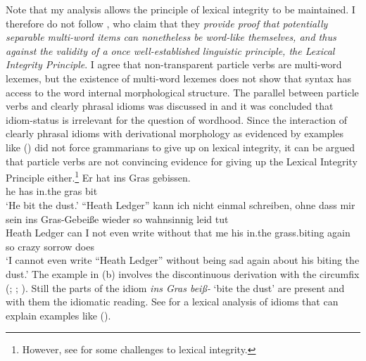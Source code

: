 \begin{exe}
\begin{xlist}[iv.]
\begin{exe}
\begin{xlist}[iv.]
Note that my analysis allows the principle of lexical integrity to be maintained. I therefore do
not follow \citep*[]{CSP2010a}, who claim that they \emph{provide proof that potentially
  separable multi-word items can nonetheless be word-like themselves, and thus against the validity
  of a once well-established linguistic principle, the Lexical Integrity Principle}. I agree that
non-transparent particle verbs are multi-word lexemes, but the existence of multi-word lexemes does
not show that syntax has access to the word internal morphological structure. The parallel between
particle verbs and clearly phrasal idioms was discussed in  and it
was concluded that idiom-status is irrelevant for the question of wordhood. Since the interaction of
clearly phrasal idioms with derivational morphology as evidenced by examples like () did not
force grammarians to give up on lexical integrity, it can be argued that particle verbs are not
convincing evidence for giving up the Lexical Integrity Principle either.\footnote{
  However, see  for some challenges to lexical integrity.
}
\eal
\ex
\gll Er hat ins Gras gebissen.\\
     he has in.the gras bit\\
\glt `He bit the dust.'
\ex 
\gll "`Heath Ledger"' kann ich nicht einmal schreiben, ohne dass mir sein ins Gras-Gebeiße wieder so
wahnsinnig leid tut%
\footnotemark\\
    \spacebr{}Heath Ledger can I not even write without that me his in.the grass.biting again so
    crazy sorrow does\\
\glt `I cannot even write ``Heath Ledger'' without being sad again about his biting the dust.'
\zl
The example in (b) involves the discontinuous derivation with the circumfix \gee
(\citealp[Section~3.4.3]{Luedeling2001a}; \citealp[--327, 372--377]{Mueller2002b};
\citealp[Section~2.2.1, Section~5.2.1]{Mueller2003a}). Still the parts of the idiom \emph{ins Gras
  beiß-} `bite the dust' are present and with them the idiomatic reading. See  for a lexical analysis of idioms that can
explain examples like ().



\end{xlist}
\end{exe}
\end{xlist}
\end{exe}
